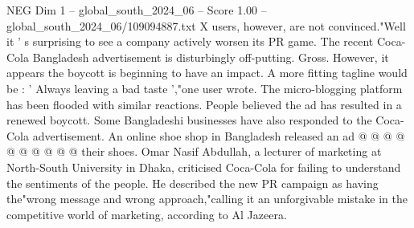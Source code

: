 \begin{textsample}{NEG Dim 1 – global\_south\_2024\_06 – Score 1.00 – global\_south\_2024\_06/109094887.txt}
X users, however, are not convinced."Well it ' s surprising to see a company actively worsen its PR game.
The recent Coca-Cola Bangladesh advertisement is disturbingly off-putting.
Gross.
However, it appears the boycott is beginning to have an impact.
A more fitting tagline would be : ' Always leaving a bad taste ',"one user wrote.
The micro-blogging platform has been flooded with similar reactions.
People believed the ad has resulted in a renewed boycott.
Some Bangladeshi businesses have also responded to the Coca-Cola advertisement.
An online shoe shop in Bangladesh released an ad @ @ @ @ @ @ @ @ @ @ their shoes.
Omar Nasif Abdullah, a lecturer of marketing at North-South University in Dhaka, criticised Coca-Cola for failing to understand the sentiments of the people.
He described the new PR campaign as having the"wrong message and wrong approach,"calling it an unforgivable mistake in the competitive world of marketing, according to Al Jazeera.

\end{textsample}
